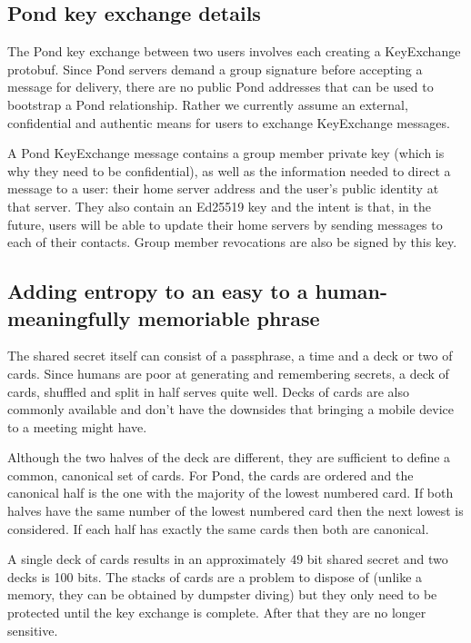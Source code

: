 \documentclass[letterpaper,twocolumn,10pt]{article}
\begin{document}
\subsection{Pond key exchange details}

The Pond key exchange between two users involves each creating a KeyExchange
protobuf\cite{pondprotobufs}. Since Pond servers demand a group signature
before accepting a message for delivery, there are no public Pond addresses
that can be used to bootstrap a Pond relationship.  Rather we currently assume
an external, confidential and authentic means for users to exchange KeyExchange
messages.

A Pond KeyExchange message contains a group member private key (which is why
they need to be confidential), as well as the information needed to direct a
message to a user: their home server address and the user's public identity at
that server.  They also contain an Ed25519 key and the intent is that, in the
future, users will be able to update their home servers by sending messages to
each of their contacts. Group member revocations are also be signed by this
key.

\subsection{Adding entropy to an easy to a human-meaningfully memoriable phrase}

The shared secret itself can consist of a passphrase, a time and a deck or two
of cards. Since humans are poor at generating and remembering secrets, a deck
of cards, shuffled and split in half serves quite well. Decks of cards are also
commonly available and don't have the downsides that bringing a mobile device
to a meeting might have.

Although the two halves of the deck are different, they are sufficient to
define a common, canonical set of cards. For Pond, the cards are ordered and
the canonical half is the one with the majority of the lowest numbered card. If
both halves have the same number of the lowest numbered card then the next
lowest is considered. If each half has exactly the same cards then both are
canonical.

A single deck of cards results in an approximately 49 bit shared secret and two
decks is 100 bits. The stacks of cards are a problem to dispose of (unlike a
memory, they can be obtained by dumpster diving) but they only need to be
protected until the key exchange is complete. After that they are no longer
sensitive.
\end{document}
